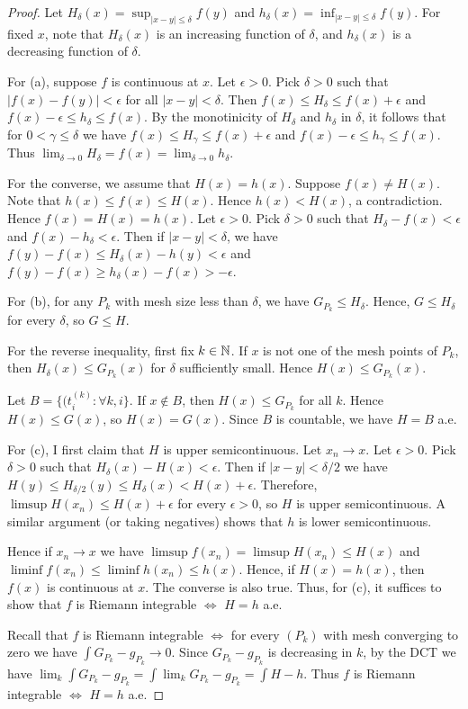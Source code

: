 \documentclass{article}
\begin{document}
\begin{proof}
Let $H_\delta(x) = \sup_{|x - y| \le \delta} f(y)$ and $h_\delta(x) = \inf_{|x - y| \le \delta} f(y)$. For fixed $x$, note that $H_\delta(x)$ is an increasing function of $\delta$, and $h_\delta(x)$ is a decreasing function of $\delta$.

For (a), suppose $f$ is continuous at $x$. Let $\epsilon > 0$. Pick $\delta > 0$ such that $|f(x) - f(y)| < \epsilon$ for all $|x - y| < \delta$.  Then $f(x) \le H_\delta \le f(x) + \epsilon$ and $f(x) - \epsilon \le h_\delta \le f(x)$.  By the monotinicity of $H_\delta$ and $h_\delta$ in $\delta$, it follows that for $0 < \gamma \le  \delta$ we have $f(x) \le H_\gamma \le f(x) + \epsilon$ and $f(x) - \epsilon \le h_\gamma \le f(x)$.  Thus $\lim_{\delta \to 0} H_\delta = f(x) = \lim_{\delta \to 0} h_\delta$.

For the converse, we assume that $H(x) = h(x)$.  Suppose $f(x) \neq H(x)$.  Note that $h(x) \le f(x) \le H(x)$.  Hence $h(x) < H(x)$, a contradiction.  Hence $f(x) = H(x) = h(x)$.  Let $\epsilon > 0$.  Pick $\delta > 0$ such that $H_\delta - f(x) < \epsilon$ and $f(x) - h_\delta < \epsilon$. Then if $|x - y| < \delta$, we have $f(y) - f(x) \le H_\delta(x) - h(y) < \epsilon$ and $f(y) - f(x) \ge h_\delta(x) - f(x) > - \epsilon$.

For (b), for any  $P_k$ with mesh size less than $\delta$, we have $G_{P_k} \le H_\delta$. Hence, $G \le H_\delta$ for every $\delta$, so $G \le H$.  

For the reverse inequality, first fix $k \in \mathbb{N}$. If $x$ is not one of the mesh points of $P_k$, then $H_\delta(x) \le G_{P_k}(x)$ for $\delta$ sufficiently small. Hence $H(x) \le G_{P_k}(x)$.  

Let $B = \{(t_i^{(k)} : \forall k, i\}$. If $x \not \in B$, then $H(x) \le G_{P_k}$ for all $k$.  Hence $H(x) \le G(x)$, so $H(x) = G(x)$.  Since $B$ is countable, we have $H = B$ a.e.

For (c), I first claim that $H$ is upper semicontinuous. Let $x_n \to x$.  Let $\epsilon > 0$. Pick $\delta > 0$ such that $H_\delta(x)  - H(x) < \epsilon$. Then if $|x - y| < \delta/2$ we have $H(y) \le H_{\delta/2}(y) \le H_\delta(x) < H(x) + \epsilon$.  Therefore, $\limsup H(x_n) \le H(x) + \epsilon$ for every $\epsilon > 0$, so $H$ is upper semicontinuous. A similar argument (or taking negatives) shows that $h$ is lower semicontinuous.

Hence if $x_n \to x$ we have $\limsup f(x_n) = \limsup H(x_n) \le H(x)$ and $\liminf f(x_n) \le \liminf h(x_n) \le h(x)$. Hence, if $H(x) = h(x)$, then $f(x)$ is continuous at $x$.  The converse is also true. Thus, for (c), it suffices to show that $f$ is Riemann integrable $\iff$ $H = h$ a.e.

Recall that $f$ is Riemann integrable $\iff$ for every $(P_k)$ with mesh converging to zero we have $\int G_{P_k} - g_{P_k} \to 0$.  Since $G_{P_k} - g_{P_k}$ is decreasing in $k$, by the DCT we have $\lim_k \int G_{P_k} - g_{P_k} = \int \lim_k G_{P_k} - g_{P_k} = \int H - h$.  Thus $f$ is Riemann integrable $\iff$ $H = h$ a.e.
\end{proof}
\end{document}

